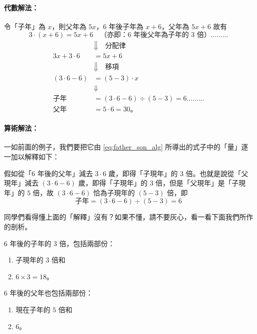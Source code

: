 \paragraph{代數解法：}
令「子年」為 $x$，則父年為 $5x$，$6$ 年後子年為 $x+6$，父年為 $5x+6$ 故有
\begin{equation}\label{eq:father_son_alg}
  3 \cdot (x+6) = 5x+6 \quad \text{（亦即：$6$ 年後父年為子年的 $3$ 倍）} \dots\dots\dots
\end{equation}
\begin{align*}
  &\Downarrow \quad \text{分配律} \\
  3x + 3 \cdot 6 &= 5x + 6 \\
  &\Downarrow \quad \text{移項} \\
  (3 \cdot 6 - 6) &= (5 - 3) \cdot x \\
  &\Downarrow \\
  \text{子年} &= (3 \cdot 6 - 6) \div (5 - 3) = 6 \dots\dots\dots \label{eq:father_son_arith} \\
  \text{父年} &= 5 \cdot 6 = 30 \text{。}
\end{align*}

\paragraph{算術解法：}
一如前面的例子，我們要把它由 \eqref{eq:father_son_alg} 所導出的式子中的「量」逐一加以解釋如下：

假如從「$6$ 年後的父年」減去 $3 \cdot 6$ 歲，即得「子現年」的 $3$ 倍。也就是說從「父現年」減去 $(3 \cdot 6 - 6)$ 歲，即得「子現年」的 $3$ 倍，但是「父現年」是「子現年」的 $5$ 倍，故 $(3 \cdot 6 - 6)$ 恰為子現年的 $(5 - 3)$ 倍，即
\begin{equation*}
  \text{子年} = (3 \cdot 6 - 6) \div (5 - 3) = 6
\end{equation*}

同學們看得懂上面的「解釋」沒有？如果不懂，請不要灰心，看一看下面我們所作的剖析。

$6$ 年後的子年的 $3$ 倍，包括兩部份：
\begin{enumerate}[(1)]
  \item 子現年的 $3$ 倍和
  \item $6 \times 3 = 18$。
\end{enumerate}

$6$ 年後的父年也包括兩部份：
\begin{enumerate}[$(1')$]
  \item 現在子年的 $5$ 倍和
  \item $6$。
\end{enumerate}

